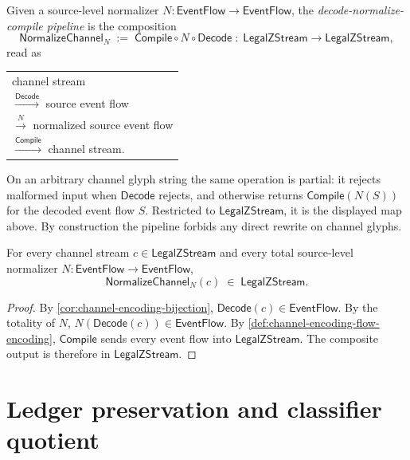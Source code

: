 \begin{definition}
\label{def:source-channel-decode-normalize-compile}
Given a source-level normalizer $N \colon \mathsf{EventFlow} \to \mathsf{EventFlow}$, the \emph{decode-normalize-compile pipeline} is the composition
$$
  \mathsf{NormalizeChannel}_{N}
  \;:=\;
  \mathsf{Compile} \circ N \circ \mathsf{Decode}
  \;\colon\; \mathsf{LegalZStream} \longrightarrow \mathsf{LegalZStream},
$$
read as
\begin{center}
\begin{tabular}{l}
  channel stream \\
  $\xrightarrow{\mathsf{Decode}}$ source event flow \\
  $\xrightarrow{N}$ normalized source event flow \\
  $\xrightarrow{\mathsf{Compile}}$ channel stream.
\end{tabular}
\end{center}
On an arbitrary channel glyph string the same operation is partial: it rejects malformed input when $\mathsf{Decode}$ rejects, and otherwise returns $\mathsf{Compile}(N(S))$ for the decoded event flow $S$. Restricted to $\mathsf{LegalZStream}$, it is the displayed map above. By construction the pipeline forbids any direct rewrite on channel glyphs.
\end{definition}

\begin{theorem}
\label{thm:source-channel-pipeline-preserves-legality}
For every channel stream $c \in \mathsf{LegalZStream}$ and every total source-level normalizer $N \colon \mathsf{EventFlow} \to \mathsf{EventFlow}$,
$$
  \mathsf{NormalizeChannel}_{N}(c) \;\in\; \mathsf{LegalZStream}.
$$
\end{theorem}

\begin{proof}
By \autoref{cor:channel-encoding-bijection}, $\mathsf{Decode}(c) \in \mathsf{EventFlow}$. By the totality of $N$, $N(\mathsf{Decode}(c)) \in \mathsf{EventFlow}$. By \autoref{def:channel-encoding-flow-encoding}, $\mathsf{Compile}$ sends every event flow into $\mathsf{LegalZStream}$. The composite output is therefore in $\mathsf{LegalZStream}$.
\end{proof}

\section{Ledger preservation and classifier quotient}
\label{sec:source-channel-ledger-and-quotient}

